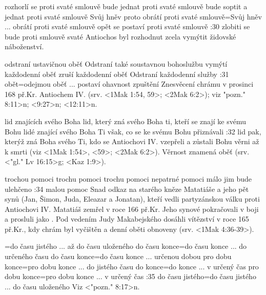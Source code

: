     {rozhorlí se proti svaté smlouvě}   %
    {bude jednat proti svaté smlouvě}   %
    {bude soptit a jednat proti svaté smlouvě}   %
    {Svůj hněv proto obrátí proti svaté smlouvě}={Svůj hněv ... obrátí proti svaté smlouvě}   %
    {opět se postaví proti svaté smlouvě}  %
:30 {zlobiti se bude proti smlouvě svaté}
    Antiochos byl rozhodnut zcela vymýtit židovské náboženství.
    
    

   {odstraní ustavičnou oběť}   %
   {Odstraní také soustavnou bohoslužbu}   %
   {vymýtí každodenní oběť}   %
   {zruší každodenní oběť}   %
   {Odstraní každodenní služby}   %
:31 {obět}={odejmou oběť ... postaví ohavnost zpuštění} 
Znesvěcení chrámu v prosinci 168 př.Kr. Antiochem IV. (srv. <1Mak 1:54, 59>; <2Mak 6:2>); viz \<"pozn." 8:11>n; <9:27>n; <12:11>n.


    
    {lid znajících svého Boha}   %
    {lid, který zná svého Boha}   %
    {ti, kteří se znají ke svému Bohu}   %
    {lidé znající svého Boha}   %
    {Ti však, co se ke svému Bohu přiznávali}   %
:32 {lid pak, kterýž zná Boha svého}
    Ti, kdo se Antiochovi IV. vzepřeli a zůstali Bohu věrni až k smrti (viz <1Mak 1:54>, <59>; <2Mak 6:2>). Věrnost znamená oběť (srv. 
    <"gl." Lv 16:15>g; <Kaz 1:9>).


   {trochou pomoci}   %
   {trochu pomoci}   %
   {trochu pomoci}   %
   {nepatrné pomoci}   %
   {málo jim bude ulehčeno}   %
:34 {malou pomoc}  Snad odkaz na starého kněze Matatiáše a jeho pět synů (Jan, Šimon, Juda, Eleazar a Jonatan), kteří vedli partyzánskou válku proti Antiochovi IV. Matatiáš zemřel v roce 166 př.Kr. Jeho synové pokračovali v boji a prosluli jako . Pod vedením Judy Makabejského dosáhli vítězství v roce 165 př.Kr., kdy chrám byl vyčištěn a denní oběti obnoveny (srv. <1Mak 4:36-39>).

={do času jistého ... až do času uloženého}   %
    {do času konce}={do času konce ... do určeného času}   %
    {do času konce}={do času konce ... určenou dobou}   %
    {pro dobu konce}={pro dobu konce ... do jistého času}   %
    {do konce}={do konce ... v určený čas}   %
    {pro dobu konce}={pro dobu konce ... v určený čas}   %
:35 {do času jistého}={do času jistého ... do času uloženého}  
    Viz <"pozn." 8:17>n.
    

